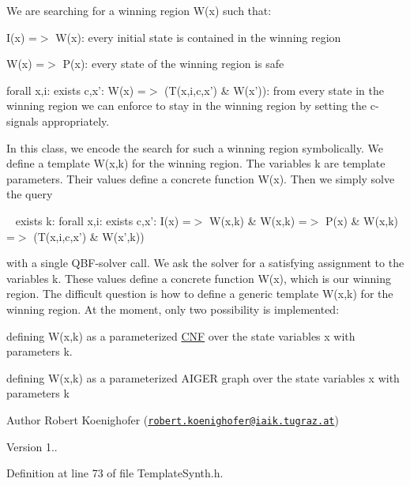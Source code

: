 We are searching for a winning region W(x) such that\-: 
\begin{DoxyEnumerate}
\item I(x) =$>$ W(x)\-: every initial state is contained in the winning region 
\item W(x) =$>$ P(x)\-: every state of the winning region is safe 
\item forall x,i\-: exists c,x'\-: W(x) =$>$ (T(x,i,c,x') \& W(x'))\-: from every state in the winning region we can enforce to stay in the winning region by setting the c-\/signals appropriately. 
\end{DoxyEnumerate}In this class, we encode the search for such a winning region symbolically. We define a template W(x,k) for the winning region. The variables k are template parameters. Their values define a concrete function W(x). Then we simply solve the query \par
 ~ exists k\-: forall x,i\-: exists c,x'\-: I(x) =$>$ W(x,k) \& W(x,k) =$>$ P(x) \& W(x,k) =$>$ (T(x,i,c,x') \& W(x',k)) \par
 with a single Q\-B\-F-\/solver call. We ask the solver for a satisfying assignment to the variables k. These values define a concrete function W(x), which is our winning region. The difficult question is how to define a generic template W(x,k) for the winning region. At the moment, only two possibility is implemented\-: 
\begin{DoxyItemize}
\item defining W(x,k) as a parameterized \hyperlink{classCNF}{C\-N\-F} over the state variables x with parameters k. 
\item defining W(x,k) as a parameterized A\-I\-G\-E\-R graph over the state variables x with parameters k 
\end{DoxyItemize}

\begin{DoxyAuthor}{Author}
Robert Koenighofer (\href{mailto:robert.koenighofer@iaik.tugraz.at}{\tt robert.\-koenighofer@iaik.\-tugraz.\-at}) 
\end{DoxyAuthor}
\begin{DoxyVersion}{Version}
1.. 
\end{DoxyVersion}


Definition at line 73 of file Template\-Synth.\-h.



